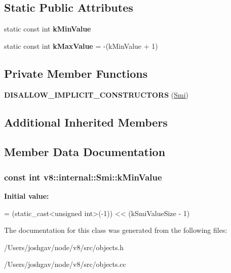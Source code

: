 \subsection*{Static Public Attributes}
\begin{DoxyCompactItemize}
\item 
static const int {\bfseries k\+Min\+Value}
\item 
static const int {\bfseries k\+Max\+Value} = -\/(k\+Min\+Value + 1)\hypertarget{classv8_1_1internal_1_1_smi_a7551831ea8fb68fc44cc19c9b6fa0dee}{}\label{classv8_1_1internal_1_1_smi_a7551831ea8fb68fc44cc19c9b6fa0dee}

\end{DoxyCompactItemize}
\subsection*{Private Member Functions}
\begin{DoxyCompactItemize}
\item 
{\bfseries D\+I\+S\+A\+L\+L\+O\+W\+\_\+\+I\+M\+P\+L\+I\+C\+I\+T\+\_\+\+C\+O\+N\+S\+T\+R\+U\+C\+T\+O\+RS} (\hyperlink{classv8_1_1internal_1_1_smi}{Smi})\hypertarget{classv8_1_1internal_1_1_smi_a1596728b17945a534fbf7f9e9e4d6d3e}{}\label{classv8_1_1internal_1_1_smi_a1596728b17945a534fbf7f9e9e4d6d3e}

\end{DoxyCompactItemize}
\subsection*{Additional Inherited Members}


\subsection{Member Data Documentation}
\subsubsection[{\texorpdfstring{k\+Min\+Value}{kMinValue}}]{\setlength{\rightskip}{0pt plus 5cm}const int v8\+::internal\+::\+Smi\+::k\+Min\+Value\hspace{0.3cm}{\ttfamily [static]}}\hypertarget{classv8_1_1internal_1_1_smi_a98555c8d040a2a4881bd301a294d2969}{}\label{classv8_1_1internal_1_1_smi_a98555c8d040a2a4881bd301a294d2969}
{\bfseries Initial value\+:}
\begin{DoxyCode}
=
      (\textcolor{keyword}{static\_cast<}\textcolor{keywordtype}{unsigned} \textcolor{keywordtype}{int}\textcolor{keyword}{>}(-1)) << (kSmiValueSize - 1)
\end{DoxyCode}


The documentation for this class was generated from the following files\+:\begin{DoxyCompactItemize}
\item 
/\+Users/joshgav/node/v8/src/objects.\+h\item 
/\+Users/joshgav/node/v8/src/objects.\+cc\end{DoxyCompactItemize}
